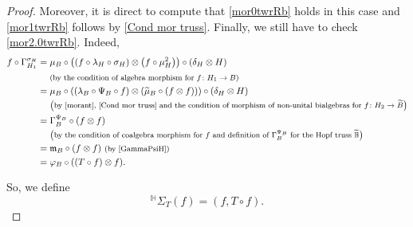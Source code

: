 \documentclass[10pt,a4paper]{amsart}
\numberwithin{equation}{section}
\begin{document}
\begin{proof}
Moreover, it is direct to compute that \eqref{mor0twrRb} holds in this case and \eqref{mor1twrRb} follows by \eqref{Cond mor truss}. Finally, we still have to check \eqref{mor2.0twrRb}. Indeed,
\begin{align*}
f\circ \Gamma_{H_{1}}^{\sigma_{H}}
={}&\mu_{B}\circ\bigl((f\circ\lambda_{H}\circ \sigma_{H})\otimes\bigl(f\circ\mu_{H}^{2}\bigr)\bigr)\circ(\delta_{H}\otimes H)\\
&{} \text{\footnotesize\textnormal{(by the condition of algebra morphism for $f\colon H_{1}\rightarrow B$)}}\\
={}&\mu_{B}\circ((\lambda_{B}\circ\Psi_{B}\circ f)\otimes (\widetilde{\mu}_{B}\circ(f\otimes f)))\circ(\delta_{H}\otimes H)\\
&{} \text{\footnotesize\textnormal{\big(by \eqref{morant}, \eqref{Cond mor truss} and the condition of morphism of non-unital bialgebras for $f\colon H_{2}\rightarrow \widetilde{B}$\big)}}\\
={}&\Gamma_{B}^{\Psi_{B}}\circ(f\otimes f)\\
&{} \text{\footnotesize\textnormal{\big(by the condition of coalgebra morphism for $f$ and definition of $\Gamma_{B}^{\Psi_{B}}$ for the Hopf truss $\widetilde{\mathbb{B}}$\big)}}\\
={}&\mathfrak{m}_{B}\circ(f\otimes f)\ \text{\footnotesize\textnormal{(by \eqref{GammaPsiH})}}\\
={}&\varphi_{B}\circ((T\circ f)\otimes f).
\end{align*}

So, we define
\[{}^{\mathbb{H}}\Sigma_{T}(f)=(f,T\circ f).\]


\end{proof}
\end{document}
